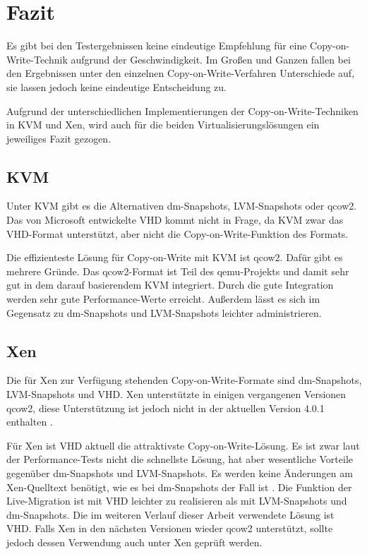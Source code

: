 \section{Fazit}
Es gibt bei den Testergebnissen keine eindeutige Empfehlung für eine Copy-on-Write-Technik aufgrund der Geschwindigkeit. Im Großen und Ganzen fallen bei den Ergebnissen unter den einzelnen Copy-on-Write-Verfahren Unterschiede auf, sie lassen jedoch keine eindeutige Entscheidung zu.

Aufgrund der unterschiedlichen Implementierungen der Copy-on-Write-Techniken in KVM und Xen, wird auch für die beiden Virtualisierungslösungen ein jeweiliges Fazit gezogen.

\subsection{KVM}\label{KVM}
Unter KVM gibt es die Alternativen dm-Snapshots, LVM-Snapshots oder qcow2. Das von Microsoft entwickelte VHD kommt nicht in Frage, da KVM zwar das VHD-Format unterstützt, aber nicht die Copy-on-Write-Funktion des Formats. 

Die effizienteste Lösung für Copy-on-Write mit KVM ist qcow2. Dafür gibt es mehrere Gründe. Das qcow2-Format ist Teil des qemu-Projekts und damit sehr gut in dem darauf basierendem KVM integriert. Durch die gute Integration werden sehr gute Performance-Werte erreicht. Außerdem lässt es sich im Gegensatz zu dm-Snapshots und LVM-Snapshots leichter administrieren.

\subsection{Xen}
Die für Xen zur Verfügung stehenden Copy-on-Write-Formate sind dm-Snapshots, LVM-Snapshots und VHD. Xen unterstützte in einigen vergangenen Versionen qcow2, diese Unterstützung ist jedoch nicht in der aktuellen Version 4.0.1 enthalten \cite{Qcow2support}. 

Für Xen ist VHD aktuell die attraktivste Copy-on-Write-Lösung. Es ist zwar laut der Performance-Tests nicht die schnellste Lösung, hat aber wesentliche Vorteile gegenüber dm-Snapshots und LVM-Snapshots. Es werden keine Änderungen am Xen-Quelltext benötigt, wie es bei dm-Snapshots der Fall ist \cite{Racecondition}. Die Funktion der Live-Migration ist mit VHD leichter zu realisieren als mit LVM-Snapshots und dm-Snapshots. Die im weiteren Verlauf dieser Arbeit verwendete Lösung ist VHD. Falls Xen in den nächsten Versionen wieder qcow2 unterstützt, sollte jedoch dessen Verwendung auch unter Xen geprüft werden. 